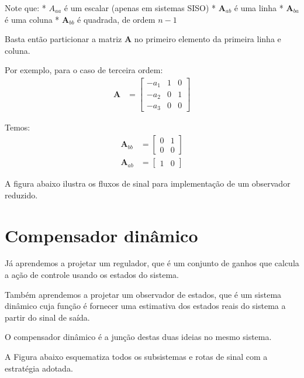 \documentclass[
]{book}
\begin{document}
Note que: * \(A_{aa}\) é um escalar (apenas em sistemas SISO) *
\(\mathbf{A}_{ab}\) é uma linha * \(\mathbf{A}_{ba}\) é uma coluna *
\(\mathbf{A}_{bb}\) é quadrada, de ordem \(n-1\)

Basta então particionar a matriz \(\mathbf{A}\) no primeiro elemento da
primeira linha e coluna.

Por exemplo, para o caso de terceira ordem: \[
\begin{align*}
\mathbf{A} &= \left[
        \begin{array}{rrr}
        -a_1 & 1 & 0\\
        -a_2 & 0 & 1\\
        -a_3 & 0 & 0\end{array}
    \right]
\end{align*}
\]

Temos: \[
\begin{align*}
\mathbf{A}_{bb} &= \left[
        \begin{array}{rrr}
         0 & 1\\
         0 & 0\end{array}
    \right]\\
\mathbf{A}_{ab} &= \left[
        \begin{array}{rrr}
         1 & 0\end{array}
    \right]    
\end{align*}
\]

A figura abaixo ilustra os fluxos de sinal para implementação de um
observador reduzido.



\hypertarget{compensador-dinuxe2mico}{%
\section{Compensador dinâmico}\label{compensador-dinuxe2mico}}

Já aprendemos a projetar um regulador, que é um conjunto de ganhos que
calcula a ação de controle usando os estados do sistema.

Também aprendemos a projetar um observador de estados, que é um sistema
dinâmico cuja função é fornecer uma estimativa dos estados reais do
sistema a partir do sinal de saída.

O compensador dinâmico é a junção destas duas ideias no mesmo sistema.

A Figura abaixo esquematiza todos os subsistemas e rotas de sinal com a
estratégia adotada.
\end{document}
